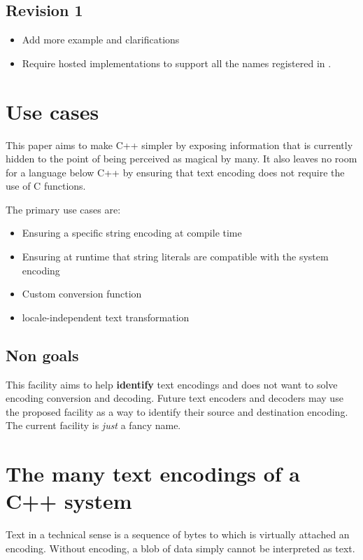 \documentclass{wg21}
\begin{document}
\subsection*{Revision 1}
\begin{itemize}
    \item Add more example and clarifications
    \item Require hosted implementations to support all the names registered in \cite{rfc3808}.
\end{itemize}

\section{Use cases}

This paper aims to make C++ simpler by exposing information that is currently hidden to the point of
being perceived as magical by many.
It also leaves no room for a language below C++ by ensuring that text encoding does not require the use of C functions.

The primary use cases are:

\begin{itemize}
    \item Ensuring a specific string encoding at compile time
    \item Ensuring at runtime that string literals are compatible with the system encoding
    \item Custom conversion function
    \item locale-independent text transformation
\end{itemize}

\subsection{Non goals}

This facility aims to help \textbf{identify} text encodings and does not want to solve encoding conversion and decoding.
Future text encoders and decoders may use the proposed facility as a way to identify their source and destination encoding.
The current facility is \emph{just} a fancy name.

\section{The many text encodings of a C++ system}

Text in a technical sense is a sequence of bytes to which is virtually attached an encoding.
Without encoding, a blob of data simply cannot be interpreted as text.
\end{document}
